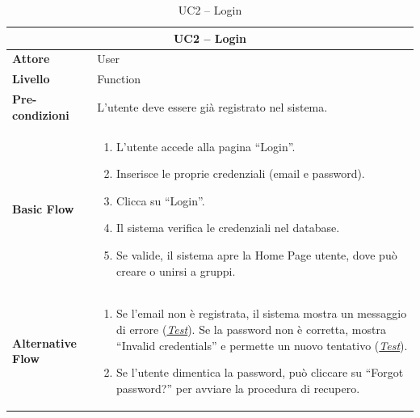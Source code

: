\begin{table}[htbp]
    \centering
    \footnotesize
    \begin{tabularx}{\textwidth}{|l|X|}
        \hline
        \multicolumn{2}{|c|}{\textbf{UC2 -- Login}} \\
        \hline
        \textbf{Attore} & User \\
        \hline
        \textbf{Livello} & Function \\
        \hline
        \textbf{Pre-condizioni} & L'utente deve essere già registrato nel sistema. \\
        \hline
        \textbf{Basic Flow} & 
        \begin{enumerate}[leftmargin=*, nosep, topsep=3pt]
            \item L'utente accede alla pagina ``Login''.
            \item Inserisce le proprie credenziali (email e password).
            \item Clicca su ``Login''.
            \item Il sistema verifica le credenziali nel database.
            \item Se valide, il sistema apre la Home Page utente, dove può creare o unirsi a gruppi.
        \end{enumerate} \\
        \hline
        \textbf{Alternative Flow} & 
        \begin{enumerate}[label=4\alph*., leftmargin=*, nosep, topsep=3pt]
            \item Se l'email non è registrata, il sistema mostra un messaggio di errore (\hyperref[test:uc2_invalid_email]{\textit{Test}}). 
            Se la password non è corretta, mostra ``Invalid credentials'' e permette un nuovo tentativo (\hyperref[test:uc2_wrong_password]{\textit{Test}}).
            \item Se l'utente dimentica la password, può cliccare su ``Forgot password?'' per avviare la procedura di recupero.
        \end{enumerate} \\
        \hline
    \end{tabularx}
    \caption{UC2 -- Login}
    \label{tab:uc2}
\end{table}

